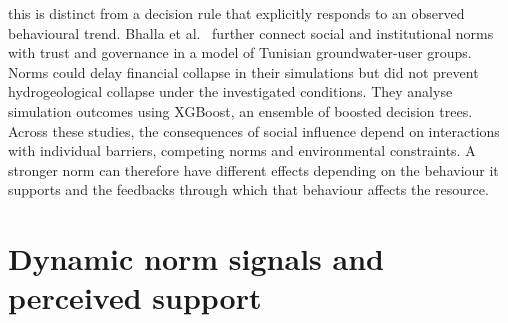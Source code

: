 this is distinct from a decision rule that explicitly responds to an observed behavioural trend. Bhalla
et al.~\cite{bhalla2024groundwater} further connect social and institutional norms with trust and
governance in a model of Tunisian groundwater-user groups. Norms could delay financial collapse in their
simulations but did not prevent hydrogeological collapse under the investigated conditions. They analyse
simulation outcomes using XGBoost, an ensemble of boosted decision trees. Across these studies, the
consequences of social influence depend on interactions with individual barriers, competing norms and
environmental constraints. A stronger norm can therefore have different effects depending on the
behaviour it supports and the feedbacks through which that behaviour affects the resource.

\section{Dynamic norm signals and perceived support}
\label{sec:related-dynamic-norms}


